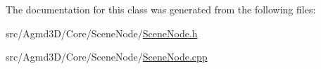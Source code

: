The documentation for this class was generated from the following files\+:\begin{DoxyCompactItemize}
\item 
src/\+Agmd3\+D/\+Core/\+Scene\+Node/\hyperlink{_scene_node_8h}{Scene\+Node.\+h}\item 
src/\+Agmd3\+D/\+Core/\+Scene\+Node/\hyperlink{_scene_node_8cpp}{Scene\+Node.\+cpp}\end{DoxyCompactItemize}
